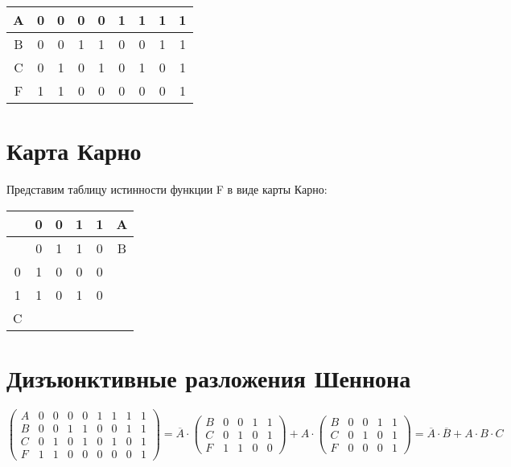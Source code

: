 \documentclass[a4paper,10pt]{article} %
\begin{document}
	\begin{tabular}{|c|c|c|c|c|c|c|c|c|}
		\hline 
		A & 0 & 0 & 0 & 0 & 1 & 1 & 1 & 1 \\ 
		\hline 
		B & 0 & 0 & 1 & 1 & 0 & 0 & 1 & 1 \\ 
		\hline 
		C & 0 & 1 & 0 & 1 & 0 & 1 & 0 & 1 \\ 
		\hline 
		F & 1 & 1 & 0 & 0 & 0 & 0 & 0 & 1 \\ 
		\hline 
	\end{tabular} 
	
	\section{Карта Карно}
	
	Представим таблицу истинности функции F в виде карты Карно: \\
	
	\begin{tabular}{|c|c|c|c|c|c|}
		\hline 
		& 0 & 0 & 1 & 1 & A \\ 
		\hline 
		& 0 & 1 & 1 & 0 & B \\ 
		\hline 
		0 & 1 & 0 & 0 & 0 &  \\ 
		\hline 
		1 & 1 & 0 & 1 & 0 &  \\ 
		\hline 
		C &  &  &  &  &  \\ 
		\hline 
	\end{tabular} 

	\section{Дизъюнктивные разложения Шеннона}
	
	\begin{equation}
		\left(
		\begin{smallmatrix}
			A & 0 & 0 & 0 & 0 & 1 & 1 & 1 & 1 \\
			B & 0 & 0 & 1 & 1 & 0 & 0 & 1 & 1 \\
			C & 0 & 1 & 0 & 1 & 0 & 1 & 0 & 1 \\
			F & 1 & 1 & 0 & 0 & 0 & 0 & 0 & 1
		\end{smallmatrix}
		\right)
		= 
		\overline{A} \cdot 
		\left(
		\begin{smallmatrix}
			B & 0 & 0 & 1 & 1 \\
			C & 0 & 1 & 0 & 1 \\
			F & 1 & 1 & 0 & 0
		\end{smallmatrix} 
		\right)
		+ 
		A \cdot
		\left(
		\begin{smallmatrix}
			B & 0 & 0 & 1 & 1 \\
			C & 0 & 1 & 0 & 1 \\
			F & 0 & 0 & 0 & 1
		\end{smallmatrix}
		\right)
		= \overline{A} \cdot \overline{B} + A \cdot B \cdot C
	\end{equation}
	
\end{document}
